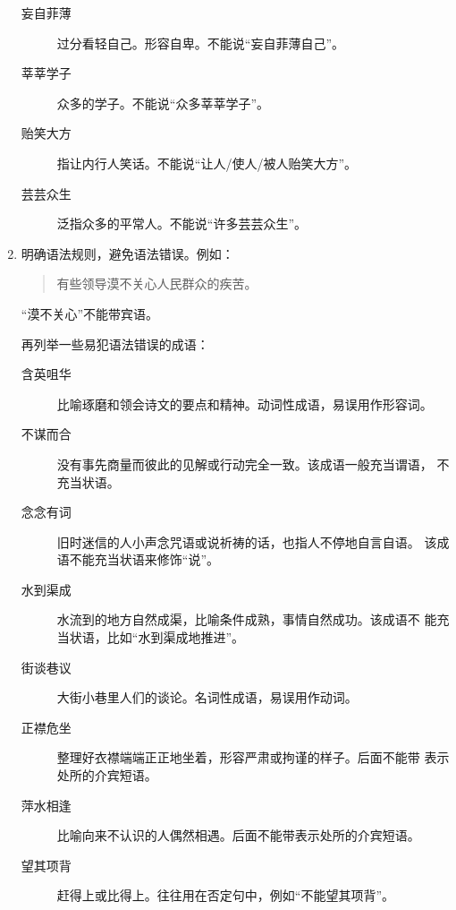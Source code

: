 \documentclass[final,oneside]{ctexbook}
\newenvironment{equotation}{\begin{quotation}\kaishu}{\end{quotation}}
\begin{document}
\begin{enumerate}
\begin{description}
      \item[妄自菲薄] 过分看轻自己。形容自卑。不能说“妄自菲薄自己”。

      \item[莘莘学子] 众多的学子。不能说“众多莘莘学子”。

      \item[贻笑大方] 指让内行人笑话。不能说“让人/使人/被人贻笑大方”。

      \item[芸芸众生] 泛指众多的平常人。不能说“许多芸芸众生”。

    \end{description}

  \item 明确语法规则，避免语法错误。例如：
    \begin{equotation}
      有些领导漠不关心人民群众的疾苦。
    \end{equotation}
    “漠不关心”不能带宾语。

    再列举一些易犯语法错误的成语：

    \begin{description}

      \item[含英咀华] 比喻琢磨和领会诗文的要点和精神。动词性成语，易误用作形容词。

      \item[不谋而合] 没有事先商量而彼此的见解或行动完全一致。该成语一般充当谓语，
        不充当状语。

      \item[念念有词] 旧时迷信的人小声念咒语或说祈祷的话，也指人不停地自言自语。
        该成语不能充当状语来修饰“说”。

      \item[水到渠成] 水流到的地方自然成渠，比喻条件成熟，事情自然成功。该成语不
        能充当状语，比如“水到渠成地推进”。

      \item[街谈巷议] 大街小巷里人们的谈论。名词性成语，易误用作动词。

      \item[正襟危坐] 整理好衣襟端端正正地坐着，形容严肃或拘谨的样子。后面不能带
        表示处所的介宾短语。

      \item[萍水相逢] 比喻向来不认识的人偶然相遇。后面不能带表示处所的介宾短语。

      \item[望其项背] 赶得上或比得上。往往用在否定句中，例如“不能望其项背”。


\end{description}
\end{enumerate}
\end{document}
